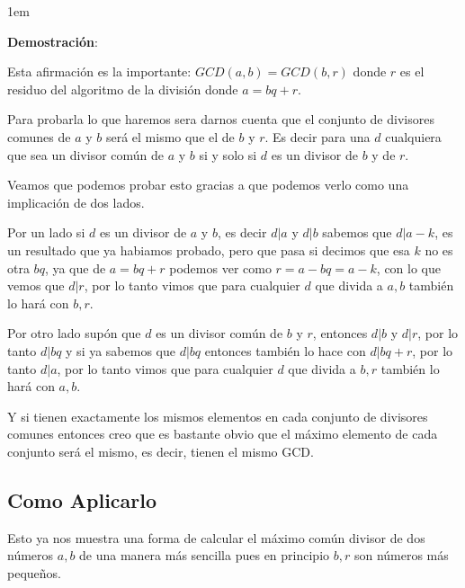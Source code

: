 \documentclass[12pt, fleqn]{report}                             %
\newenvironment{SmallIndentation}[1][0.75em]                    %
    {\begin{adjustwidth}{#1}{}\begin{footnotesize}}                 %
    {\end{footnotesize}\end{adjustwidth}}                           %
\begin{document}
        \begin{SmallIndentation}[1em]
            \textbf{Demostración}:

            Esta afirmación es la importante: $GCD(a,b) = GCD(b,r)$ donde $r$ es el residuo
            del algoritmo de la división donde $a=bq+r$.

            Para probarla lo que haremos sera darnos cuenta que el conjunto de divisores
            comunes de $a$ y $b$ será el mismo que el de $b$ y $r$.
            Es decir para una $d$ cualquiera que sea un divisor común de $a$ y $b$ si y solo si
            $d$ es un divisor de $b$ y de $r$.

            Veamos que podemos probar esto gracias a que podemos verlo como una implicación de
            dos lados.

            Por un lado si $d$ es un divisor de $a$ y $b$, es decir $d|a$ y $d|b$
            sabemos que $d|a-k$, es un resultado que ya habiamos probado, pero que
            pasa si decimos que esa $k$ no es otra $bq$, ya que de $a=bq+r$ podemos 
            ver como $r=a-bq = a-k$, con lo que vemos que $d|r$, por lo tanto
            vimos que para cualquier $d$ que divida a $a,b$ también lo hará con $b,r$.

            Por otro lado supón que $d$ es un divisor común de $b$ y $r$, entonces
            $d|b$ y $d|r$, por lo tanto $d|bq$ y si ya sabemos que $d|bq$ entonces
            también lo hace con $d|bq+r$, por lo tanto $d|a$, por lo tanto
            vimos que para cualquier $d$ que divida a $b,r$ también lo hará con $a,b$.

            Y si tienen exactamente los mismos elementos en cada conjunto de divisores
            comunes entonces creo que es bastante obvio que el máximo elemento de cada
            conjunto será el mismo, es decir, tienen el mismo GCD.

        \end{SmallIndentation}


        \clearpage
        \subsection{Como Aplicarlo}

            Esto ya nos muestra una forma de calcular el máximo común divisor de dos
            números $a,b$ de una manera más sencilla pues en principio $b,r$ son
            números más pequeños.
\end{document}
